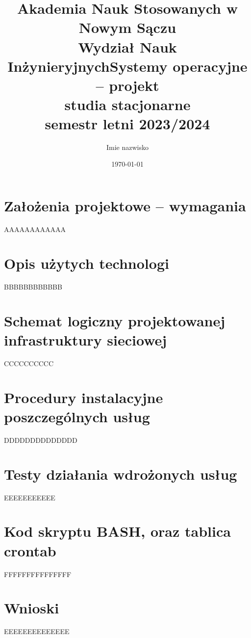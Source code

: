 \documentclass[a4paper]{article}
\title{\textbf{Akademia Nauk Stosowanych w Nowym Sączu\\Wydział Nauk Inżynieryjnych\newline \newline Systemy operacyjne – projekt\\studia stacjonarne\\semestr letni 2023/2024}}
\author{Imie nazwisko}
\date{\today}
\begin{document}
\maketitle
\newpage
\tableofcontents
\newpage

\section{Założenia projektowe – wymagania}
AAAAAAAAAAAA
\section{Opis użytych technologi}
BBBBBBBBBBBB
\section{Schemat logiczny projektowanej infrastruktury sieciowej}
CCCCCCCCCC
\section{Procedury instalacyjne poszczególnych usług}
DDDDDDDDDDDDDD
\section{Testy działania wdrożonych usług}
EEEEEEEEEEE
\section{Kod skryptu BASH, oraz tablica crontab}
FFFFFFFFFFFFFFF
\section{Wnioski}
EEEEEEEEEEEEEE
\newpage
\nocite{k8s-docs}
\nocite{k8s-blog}
\nocite{k8s-github}
\printbibliography[heading=bibnumbered, label=Literatura, title=Literatura]
\end{document}
